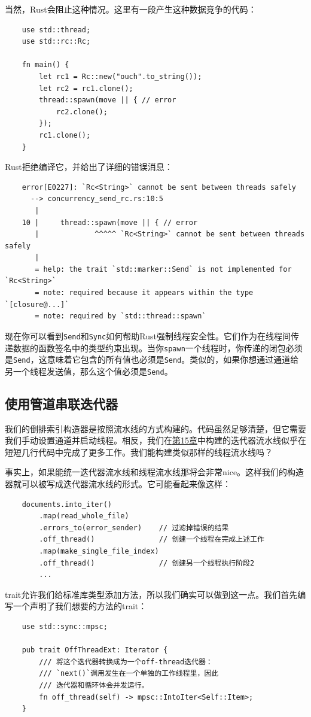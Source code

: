 当然，Rust会阻止这种情况。这里有一段产生这种数据竞争的代码：
\begin{verbatim}
    use std::thread;
    use std::rc::Rc;

    fn main() {
        let rc1 = Rc::new("ouch".to_string());
        let rc2 = rc1.clone();
        thread::spawn(move || { // error
            rc2.clone();
        });
        rc1.clone();
    }
\end{verbatim}

Rust拒绝编译它，并给出了详细的错误消息：
\begin{verbatim}
    error[E0227]: `Rc<String>` cannot be sent between threads safely
      --> concurrency_send_rc.rs:10:5
       |
    10 |     thread::spawn(move || { // error
       |             ^^^^^ `Rc<String>` cannot be sent between threads safely
       |
       = help: the trait `std::marker::Send` is not implemented for `Rc<String>`
       = note: required because it appears within the type `[closure@...]`
       = note: required by `std::thread::spawn`
\end{verbatim}

现在你可以看到\texttt{Send}和\texttt{Sync}如何帮助Rust强制线程安全性。它们作为在线程间传递数据的函数签名中的类型约束出现。当你\texttt{spawn}一个线程时，你传递的闭包必须是\texttt{Send}，这意味着它包含的所有值也必须是\texttt{Send}。类似的，如果你想通过通道给另一个线程发送值，那么这个值必须是\texttt{Send}。

\subsection{使用管道串联迭代器}
我们的倒排索引构造器是按照流水线的方式构建的。代码虽然足够清楚，但它需要我们手动设置通道并启动线程。相反，我们在\hyperref[ch15]{第15章}中构建的迭代器流水线似乎在短短几行代码中完成了更多工作。我们能构建类似那样的线程流水线吗？

事实上，如果能统一迭代器流水线和线程流水线那将会非常nice。这样我们的构造器就可以被写成迭代器流水线的形式。它可能看起来像这样：
\begin{verbatim}
    documents.into_iter()
        .map(read_whole_file)
        .errors_to(error_sender)    // 过滤掉错误的结果
        .off_thread()               // 创建一个线程在完成上述工作
        .map(make_single_file_index)
        .off_thread()               // 创建另一个线程执行阶段2
        ...
\end{verbatim}

trait允许我们给标准库类型添加方法，所以我们确实可以做到这一点。我们首先编写一个声明了我们想要的方法的trait：
\begin{verbatim}
    use std::sync::mpsc;

    pub trait OffThreadExt: Iterator {
        /// 将这个迭代器转换成为一个off-thread迭代器：
        /// `next()`调用发生在一个单独的工作线程里，因此
        /// 迭代器和循环体会并发运行。
        fn off_thread(self) -> mpsc::IntoIter<Self::Item>;
    }
\end{verbatim}

